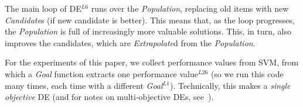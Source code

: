 The main loop of DE$^{L6}$ runs over the {\em Population}, replacing old items
with new {\em Candidate}s (if  new candidate is better).
This means that, as the loop progresses, the {\em Population} is full of increasingly
more valuable solutions. This, in turn, also improves  the candidates, which are {\em Extrapolate}d
from the {\em Population}.

For the experiments of this paper, we collect performance
values from SVM, from which a {\em Goal} function extracts one 
performance value$^{L26}$ (so we run this code many times, each time with
a different {\em Goal}$^{L1}$).  Technically, this makes a  {\em single objective} DE 
(and for notes on multi-objective DEs, see~\cite{robivc2005demo,zhang2007moea,huang2010differential}).


